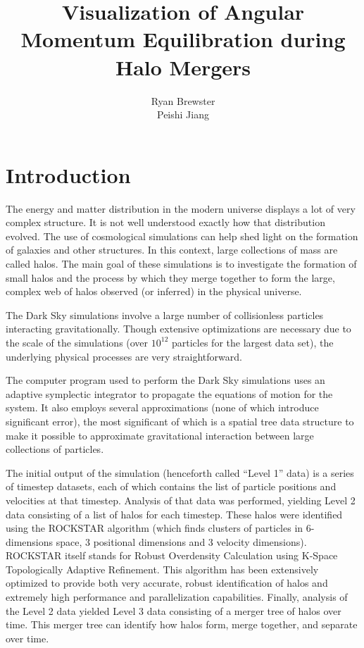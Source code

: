 \documentclass[12pt]{article}
\title{Visualization of Angular Momentum Equilibration during Halo Mergers}
\author{Ryan Brewster \\ Peishi Jiang}
\begin{document}
\maketitle

\section{Introduction}

The energy and matter distribution in the modern universe displays a lot of
very complex structure. It is not well understood exactly how that distribution
evolved. The use of cosmological simulations can help shed light on the
formation of galaxies and other structures. In this context, large collections
of mass are called halos. The main goal of these simulations is to investigate
the formation of small halos and the process by which they merge together to
form the large, complex web of halos observed (or inferred) in the physical
universe.

The Dark Sky simulations  involve a large number of collisionless particles
interacting gravitationally. Though extensive optimizations are necessary due
to the scale of the simulations (over $10^{12}$ particles for the largest data
set), the underlying physical processes are very straightforward.

The computer program used to perform the Dark Sky simulations uses an adaptive
symplectic integrator to propagate the equations of motion for the system. It
also employs several approximations (none of which introduce significant
error), the most significant of which is a spatial tree data structure to make
it possible to approximate gravitational interaction between large collections
of particles.

The initial output of the simulation (henceforth called ``Level 1'' data) is
a series of timestep datasets, each of which contains the list of particle
positions and velocities at that timestep. Analysis of that data was performed,
yielding Level 2 data consisting of a list of halos for each timestep. These
halos were identified using the ROCKSTAR algorithm (which finds clusters of
particles in 6-dimensions space, 3 positional dimensions and 3 velocity
dimensions). ROCKSTAR itself stands for Robust Overdensity Calculation using
K-Space Topologically Adaptive Refinement. This algorithm has been extensively
optimized to provide both very accurate, robust identification of halos and
extremely high performance and parallelization capabilities. Finally, analysis
of the Level 2 data yielded Level 3 data consisting of a merger tree of halos
over time. This merger tree can identify how halos form, merge together, and
separate over time.
\end{document}

